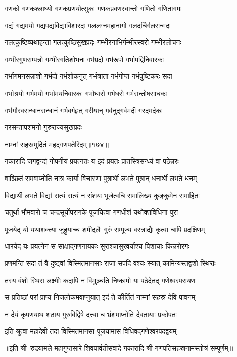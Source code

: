 \twolineshloka
{गणको गणकश्लाघ्यो गणकप्रणयोत्सुकः}%
{गणकप्रवणस्वान्तो गणितो गणितागमः}%

\twolineshloka
{गद्यं गद्यमयो गद्यपद्यविद्याविशारदः}%
{गललग्नमहानागो गलदर्चिर्गलसन्मदः}%

\twolineshloka
{गलत्कुष्ठिव्यथाहन्ता गलत्कुष्ठिसुखप्रदः}%
{गम्भीरनाभिर्गम्भीरस्वरो गम्भीरलोचनः}%

\twolineshloka
{गम्भीरगुणसम्पन्नो गम्भीरगतिशोभनः}%
{गर्भप्रदो गर्भरूपो गर्भापद्विनिवारकः}%

\twolineshloka
{गर्भागमनसन्नाशो गर्भदो गर्भशोकनुत्}%
{गर्भत्राता गर्भगोप्त गर्भपुष्टिकरः सदा}%

\twolineshloka
{गर्भाश्रयो गर्भमयो गर्भामयनिवारकः}%
{गर्भाधारो गर्भधरो गर्भसन्तोषसाधकः}%

\twolineshloka
{गर्भगौरवसन्धानसन्धानं गर्भवर्गहृत्}%
{गरीयान् गर्वनुद्गर्वमर्दी गरदमर्दकः}%

{गरसन्तापशमनो गुरुराज्यसुखप्रदः}%

{नाम्नां सहस्रमुदितं महद्गणपतेरिदम्॥१७४॥}%
\addtocounter{shlokacount}{1}

\twolineshloka
{गकारादि जगद्वन्द्यं गोपनीयं प्रयत्नतः}%
{य इदं प्रयतः प्रातस्त्रिसन्ध्यं वा पठेन्नरः}%

\twolineshloka
{वाञ्छितं समवाप्नोति नात्र कार्या विचारणा}%
{पुत्रार्थी लभते पुत्रान् धनार्थी लभते धनम्}%

\twolineshloka
{विद्यार्थी लभते विद्यां सत्यं सत्यं न संशयः}%
{भूर्जत्वचि समालिख्य कुङ्कुमेन समाहितः}%

\twolineshloka
{चतुर्थां भौमवारो च चन्द्रसूर्योपरागके}%
{पूजयित्वा गणधीशं यथोक्तविधिना पुरा}%

\twolineshloka
{पूजयेद् यो यथाशक्त्या जुहुयाच्च शमीदलैः}%
{गुरुं सम्पूज्य वस्त्राद्यैः कृत्वा चापि प्रदक्षिणम्}%

\twolineshloka
{धारयेद् यः प्रयत्नेन स साक्षाद्गणनायकः}%
{सुराश्चासुरवर्याश्च पिशाचाः किन्नरोरगः}%

\twolineshloka
{प्रणमन्ति सदा तं वै दुष्ट्वां विस्मितमानसाः}%
{राजा सपदि वश्यः स्यात् कामिन्यस्तद्वशो स्थिराः}%

\twolineshloka
{तस्य वंशो स्थिरा लक्ष्मीः कदापि न विमुञ्चति}%
{निष्कामो यः पठेदेतद् गणेश्वरपरायणः}%

\twolineshloka
{स प्रतिष्ठां परां प्राप्य निजलोकमवाप्नुयात्}%
{इदं ते कीर्तितं नाम्नां सहस्रं देवि पावनम्}%

\twolineshloka
{न देयं कृपणयाथ शठाय गुरुविद्विषे}%
{दत्त्वा च भ्रंशमाप्नोति देवतायाः प्रकोपतः}%

\twolineshloka
{इति श्रुत्वा महादेवी तदा विस्मितमानसा}%
{पूजयामास विधिवद्गणेश्वरपदद्वयम्}%

॥इति श्री~रुद्रयामले महागुप्तसारे शिवपार्वतीसंवादे गकारादि श्री गणपतिसहस्रनामस्तोत्रं सम्पूर्णम्॥
